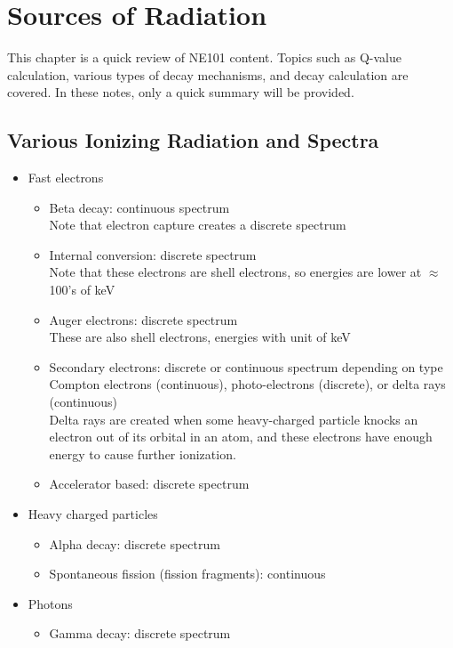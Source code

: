\section{Sources of Radiation}
This chapter is a quick review of NE101 content. Topics such as Q-value calculation, various types of decay mechanisms, and decay calculation are covered. In these notes, only a quick summary will be provided.
\subsection{Various Ionizing Radiation and Spectra}
\begin{itemize}
    \item Fast electrons
    \begin{itemize}
        \item Beta decay: continuous spectrum\\
        Note that electron capture creates a discrete spectrum
        \item Internal conversion: discrete spectrum\\
        Note that these electrons are shell electrons, so energies are lower at $\approx$100's of keV
        \item Auger electrons: discrete spectrum\\
        These are also shell electrons, energies with unit of keV
        \item Secondary electrons: discrete or continuous spectrum depending on type\\
        Compton electrons (continuous), photo-electrons (discrete), or delta rays (continuous)\\
        Delta rays are created when some heavy-charged particle knocks an electron out of its orbital in an atom, and these electrons have enough energy to cause further ionization. 
        \item Accelerator based: discrete spectrum
    \end{itemize}
    \item Heavy charged particles
    \begin{itemize}
        \item Alpha decay: discrete spectrum
        \item Spontaneous fission (fission fragments): continuous 
    \end{itemize}
    \item Photons
    \begin{itemize}
        \item Gamma decay: discrete spectrum

\end{itemize}
\end{itemize}
